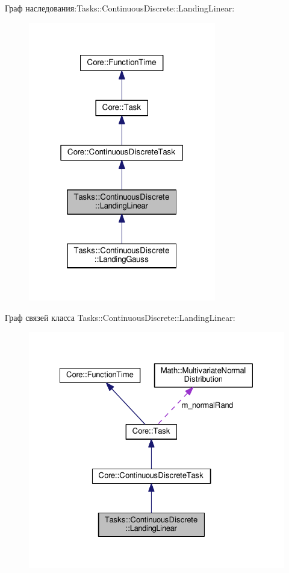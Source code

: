 Граф наследования\+:Tasks\+:\+:Continuous\+Discrete\+:\+:Landing\+Linear\+:
\nopagebreak
\begin{figure}[H]
\begin{center}
\leavevmode
\includegraphics[width=232pt]{class_tasks_1_1_continuous_discrete_1_1_landing_linear__inherit__graph}
\end{center}
\end{figure}


Граф связей класса Tasks\+:\+:Continuous\+Discrete\+:\+:Landing\+Linear\+:
\nopagebreak
\begin{figure}[H]
\begin{center}
\leavevmode
\includegraphics[width=328pt]{class_tasks_1_1_continuous_discrete_1_1_landing_linear__coll__graph}
\end{center}
\end{figure}


